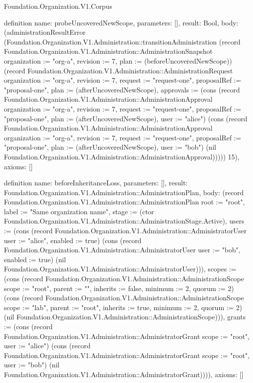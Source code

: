 \begin{lexlean}{Foundation.Organization.V1.Corpus}
\begin{semanticmodule}
definition{
  name: probeUncoveredNewScope,
  parameters: [],
  result: Bool,
  body: (administrationResultError (Foundation.Organization.V1.Administration::transitionAdministration (record Foundation.Organization.V1.Administration::AdministrationSnapshot {organization := "org-a", revision := 7, plan := (beforeUncoveredNewScope)}) (record Foundation.Organization.V1.Administration::AdministrationRequest {organization := "org-a", revision := 7, request := "request-one", proposalRef := "proposal-one", plan := (afterUncoveredNewScope), approvals := (cons (record Foundation.Organization.V1.Administration::AdministrationApproval {organization := "org-a", revision := 7, request := "request-one", proposalRef := "proposal-one", plan := (afterUncoveredNewScope), user := "alice"}) (cons (record Foundation.Organization.V1.Administration::AdministrationApproval {organization := "org-a", revision := 7, request := "request-one", proposalRef := "proposal-one", plan := (afterUncoveredNewScope), user := "bob"}) (nil Foundation.Organization.V1.Administration::AdministrationApproval)))})) 15),
  axioms: []
}

definition{
  name: beforeInheritanceLoss,
  parameters: [],
  result: Foundation.Organization.V1.Administration::AdministrationPlan,
  body: (record Foundation.Organization.V1.Administration::AdministrationPlan {root := "root", label := "Same organization name", stage := (ctor Foundation.Organization.V1.Administration::AdministrationStage.Active), users := (cons (record Foundation.Organization.V1.Administration::AdministratorUser {user := "alice", enabled := true}) (cons (record Foundation.Organization.V1.Administration::AdministratorUser {user := "bob", enabled := true}) (nil Foundation.Organization.V1.Administration::AdministratorUser))), scopes := (cons (record Foundation.Organization.V1.Administration::AdministrationScope {scope := "root", parent := "", inherits := false, minimum := 2, quorum := 2}) (cons (record Foundation.Organization.V1.Administration::AdministrationScope {scope := "lab", parent := "root", inherits := true, minimum := 2, quorum := 2}) (nil Foundation.Organization.V1.Administration::AdministrationScope))), grants := (cons (record Foundation.Organization.V1.Administration::AdministratorGrant {scope := "root", user := "alice"}) (cons (record Foundation.Organization.V1.Administration::AdministratorGrant {scope := "root", user := "bob"}) (nil Foundation.Organization.V1.Administration::AdministratorGrant)))}),
  axioms: []
}


\end{semanticmodule}
\end{lexlean}
